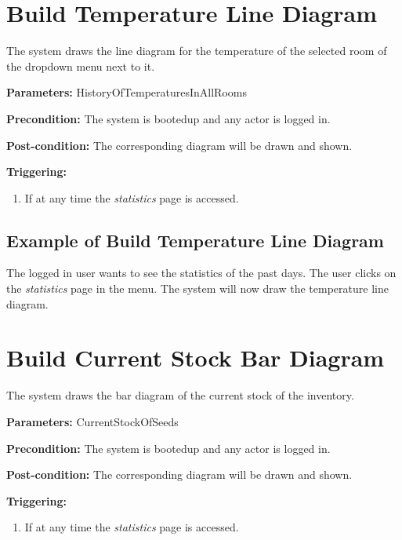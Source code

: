 \break
\section{Build Temperature Line Diagram}
\label{operation:BuildTemperatureDiagram}
The system draws the line diagram for the temperature of the selected room of
the dropdown menu next to it.

\begin{description}

\item \textbf{Parameters:} HistoryOfTemperaturesInAllRooms
\item \textbf{Precondition:} The system is bootedup and any actor is logged in.
\item \textbf{Post-condition:} The corresponding diagram will be drawn and
shown.

\item \textbf{Triggering:}
\begin{enumerate}
\item If at any time the \emph{statistics} page is accessed.
\end{enumerate}
\end{description}

\subsection{Example of Build Temperature Line Diagram}
The logged in user wants to see the statistics of the past days.
The user clicks on the \emph{statistics} page in the menu.
The system will now draw the temperature line diagram.




\section{Build Current Stock Bar Diagram}
\label{operation:BuildCurrentStockDiagram}
The system draws the bar diagram of the current stock of the inventory.

\begin{description}

\item \textbf{Parameters:} CurrentStockOfSeeds
\item \textbf{Precondition:} The system is bootedup and any actor is logged in.
\item \textbf{Post-condition:} The corresponding diagram will be drawn and
shown.

\item \textbf{Triggering:}
\begin{enumerate}
\item If at any time the \emph{statistics} page is accessed.
\end{enumerate}
\end{description}

